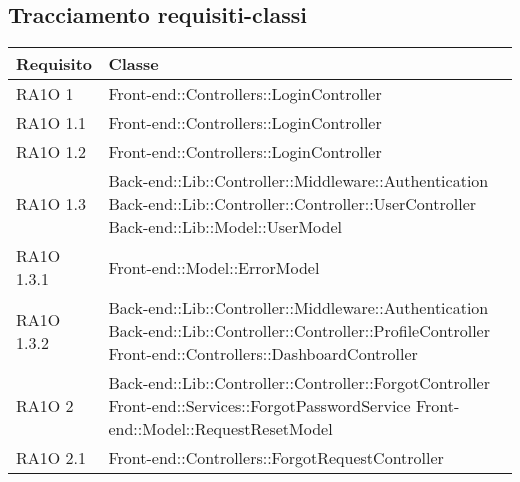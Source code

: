 \subsection{Tracciamento requisiti-classi}
\begin{center}
      \bgroup
      \def\arraystretch{1.8}
      \begin{longtable}{ | p{4cm} | p{10cm} | }
    
      \cellcolor[gray]{0.9} \textbf{Requisito} & \cellcolor[gray]{0.9} \textbf{Classe} \\ \hline
      
	RA1O 1 & Front-end::Controllers::LoginController \newline  \\ \hline 
	RA1O 1.1 & Front-end::Controllers::LoginController \newline  \\ \hline 
	RA1O 1.2 & Front-end::Controllers::LoginController \newline  \\ \hline      

	RA1O 1.3 & Back-end::Lib::Controller::Middleware::Authentication  \newline Back-end::Lib::Controller::Controller::UserController \newline Back-end::Lib::Model::UserModel \\ \hline  
    
    RA1O 1.3.1 & Front-end::Model::ErrorModel \newline  \\ \hline 
           
    RA1O 1.3.2 & Back-end::Lib::Controller::Middleware::Authentication \newline
        			Back-end::Lib::Controller::Controller::ProfileController \newline
        			Front-end::Controllers::DashboardController \newline  \\ \hline 
        				
        				     
    RA1O 2 & Back-end::Lib::Controller::Controller::ForgotController \newline
    			Front-end::Services::ForgotPasswordService \newline
    			Front-end::Model::RequestResetModel  \newline  \\ \hline   
    			   
    RA1O 2.1 & Front-end::Controllers::ForgotRequestController \newline  \\ \hline   
       

\end{longtable}
\end{center}
